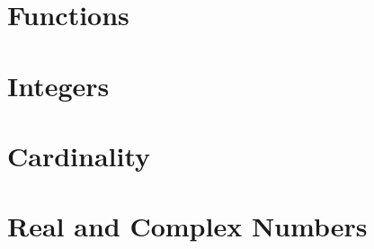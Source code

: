 \documentclass[10pt]{article}
\begin{document}
\newpage
\section{Functions}
\section{Integers}
\section{Cardinality}
\section{Real and Complex Numbers}



 





\hindex
\end{document}
